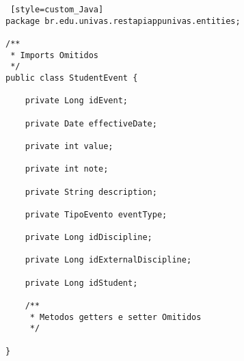 \begin{lstlisting} [style=custom_Java]
package br.edu.univas.restapiappunivas.entities;

/**
 * Imports Omitidos
 */
public class StudentEvent {

	private Long idEvent;

	private Date effectiveDate;

	private int value;

	private int note;

	private String description;

	private TipoEvento eventType;

	private Long idDiscipline;

	private Long idExternalDiscipline;

	private Long idStudent;

	/**
	 * Metodos getters e setter Omitidos
	 */

}

\end{lstlisting}
